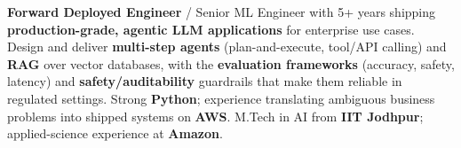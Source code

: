 \documentclass[letter,10pt]{article}
\begin{document}

\textbf{Forward Deployed Engineer} / Senior ML Engineer with 5+ years shipping \textbf{production-grade, agentic LLM applications} for enterprise use cases.
Design and deliver \textbf{multi-step agents} (plan-and-execute, tool/API calling) and \textbf{RAG} over vector databases, with the \textbf{evaluation frameworks} (accuracy, safety, latency) and \textbf{safety/auditability} guardrails that make them reliable in regulated settings.
Strong \textbf{Python}; experience translating ambiguous business problems into shipped systems on \textbf{AWS}.
M.Tech in AI from \textbf{IIT Jodhpur}; applied-science experience at \textbf{Amazon}.
\end{document}
